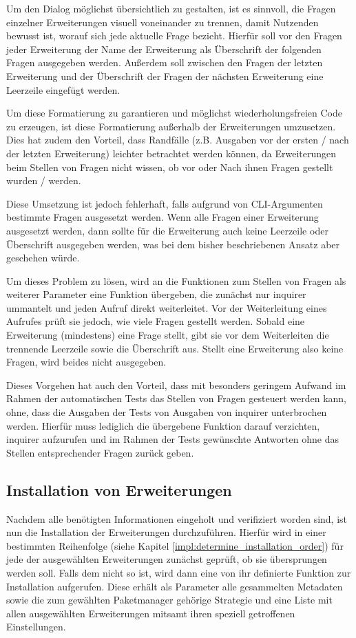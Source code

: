 Um den Dialog möglichst übersichtlich zu gestalten, ist es sinnvoll, die Fragen einzelner Erweiterungen visuell voneinander zu trennen, damit Nutzenden bewusst ist, worauf sich jede aktuelle Frage bezieht. Hierfür soll vor den Fragen jeder Erweiterung der Name der Erweiterung als Überschrift der folgenden Fragen ausgegeben werden. Außerdem soll zwischen den Fragen der letzten Erweiterung und der Überschrift der Fragen der nächsten Erweiterung eine Leerzeile eingefügt werden.

Um diese Formatierung zu garantieren und möglichst wiederholungsfreien Code zu erzeugen, ist diese Formatierung außerhalb der Erweiterungen umzusetzen. Dies hat zudem den Vorteil, dass Randfälle (z.B. Ausgaben vor der ersten / nach der letzten Erweiterung) leichter betrachtet werden können, da Erweiterungen beim Stellen von Fragen nicht wissen, ob vor oder Nach ihnen Fragen gestellt wurden / werden.

Diese Umsetzung ist jedoch fehlerhaft, falls aufgrund von \gls{CLI}-Argumenten bestimmte Fragen ausgesetzt werden. Wenn alle Fragen einer Erweiterung ausgesetzt werden, dann sollte für die Erweiterung auch keine Leerzeile oder Überschrift ausgegeben werden, was bei dem bisher beschriebenen Ansatz aber geschehen würde.

Um dieses Problem zu lösen, wird an die Funktionen zum Stellen von Fragen als weiterer Parameter eine Funktion übergeben, die zunächst nur inquirer ummantelt und jeden Aufruf direkt weiterleitet. Vor der Weiterleitung eines Aufrufes prüft sie jedoch, wie viele Fragen gestellt werden. Sobald eine Erweiterung (mindestens) eine Frage stellt, gibt sie vor dem Weiterleiten die trennende Leerzeile sowie die Überschrift aus. Stellt eine Erweiterung also keine Fragen, wird beides nicht ausgegeben.

Dieses Vorgehen hat auch den Vorteil, dass mit besonders geringem Aufwand im Rahmen der automatischen Tests das Stellen von Fragen gesteuert werden kann, ohne, dass die Ausgaben der Tests von Ausgaben von inquirer unterbrochen werden. Hierfür muss lediglich die übergebene Funktion darauf verzichten, inquirer aufzurufen und im Rahmen der Tests gewünschte Antworten ohne das Stellen entsprechender Fragen zurück geben.

\subsection{Installation von Erweiterungen}
Nachdem alle benötigten Informationen eingeholt und verifiziert worden sind, ist nun die Installation der Erweiterungen durchzuführen. Hierfür wird in einer bestimmten Reihenfolge (siehe Kapitel \ref{impl:determine_installation_order}) für jede der ausgewählten Erweiterungen zunächst geprüft, ob sie übersprungen werden soll. Falls dem nicht so ist, wird dann eine von ihr definierte Funktion zur Installation aufgerufen. Diese erhält als Parameter alle gesammelten Metadaten sowie die zum gewählten Paketmanager gehörige Strategie und eine Liste mit allen ausgewählten Erweiterungen mitsamt ihren speziell getroffenen Einstellungen.

